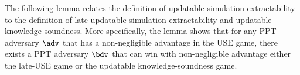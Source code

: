 
The following lemma relates the definition of updatable simulation extractability to the definition of late updatable simulation extractability and updatable knowledge soundness. More specifically, the lemma shows that for any PPT adversary $\adv$ that has a non-negligible advantage in the USE game, there exists a PPT adversary $\bdv$ that can win with non-negligible advantage either the late-USE game or the updatable knowledge-soundness game.

